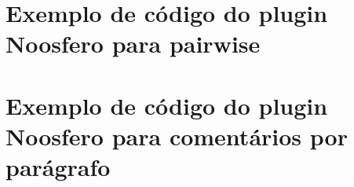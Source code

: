 \section{Exemplo de código do plugin Noosfero para pairwise}



\section{Exemplo de código do plugin Noosfero para comentários por parágrafo}



